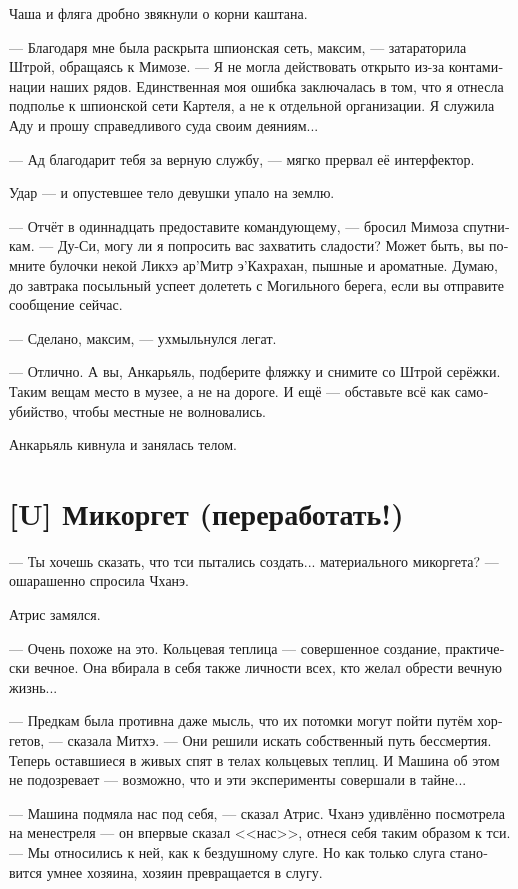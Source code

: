 \documentclass[a4paper,12pt,fleqn]{book}\usepackage{polyglossia}\setdefaultlanguage[babelshorthands=true]{russian}\setotherlanguage{english}\defaultfontfeatures{Ligatures=TeX,Mapping=tex-text}\usepackage{xcolor}\newcommand{\ml}[3]{#2}
\newcommand{\textspace}{\vspace{1em}{\centering\Large\bfseries<...>\par}\vspace{1em}}
\begin{document}
Чаша и фляга дробно звякнули о корни каштана.

--- Благодаря мне была раскрыта шпионская сеть, максим, --- затараторила Штрой, обращаясь к Мимозе.
--- Я не могла действовать открыто из-за контаминации наших рядов.
Единственная моя ошибка заключалась в том, что я отнесла подполье к шпионской сети Картеля, а не к отдельной организации.
Я служила Аду и прошу справедливого суда своим деяниям...

--- Ад благодарит тебя за верную службу, --- мягко прервал её интерфектор.

Удар --- и опустевшее тело девушки упало на землю.

--- Отчёт в одиннадцать предоставите командующему, --- бросил Мимоза спутникам.
--- Ду-Си, могу ли я попросить вас захватить сладости?
Может быть, вы помните булочки некой Ликхэ ар’Митр э’Кахрахан, пышные и ароматные.
Думаю, до завтрака посыльный успеет долететь с Могильного берега, если вы отправите сообщение сейчас.

--- Сделано, максим, --- ухмыльнулся легат.

--- Отлично.
А вы, Анкарьяль, подберите фляжку и снимите со Штрой серёжки.
Таким вещам место в музее, а не на дороге.
И ещё --- обставьте всё как самоубийство, чтобы местные не волновались.

Анкарьяль кивнула и занялась телом.

\section{[U] Микоргет (переработать!)}

\textspace

--- Ты хочешь сказать, что тси пытались создать... материального микоргета? --- ошарашенно спросила Чханэ.

Атрис замялся.

--- Очень похоже на это.
Кольцевая теплица --- совершенное создание, практически вечное.
Она вбирала в себя также личности всех, кто желал обрести вечную жизнь...

--- Предкам была противна даже мысль, что их потомки могут пойти путём хоргетов, --- сказала Митхэ.
--- Они решили искать собственный путь бессмертия.
Теперь оставшиеся в живых спят в телах кольцевых теплиц.
И Машина об этом не подозревает --- возможно, что и эти эксперименты совершали в тайне...

--- Машина подмяла нас под себя, --- сказал Атрис.
Чханэ удивлённо посмотрела на менестреля --- он впервые сказал <<нас>>, отнеся себя таким образом к тси.
--- Мы относились к ней, как к бездушному слуге.
Но как только слуга становится умнее хозяина, хозяин превращается в слугу.
\end{document}
